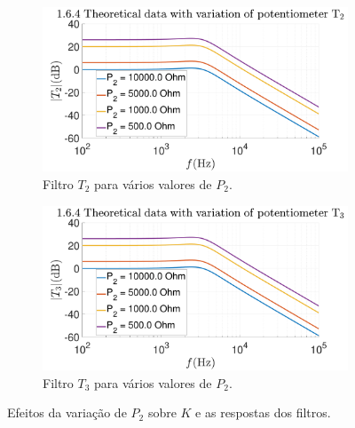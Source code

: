 \begin{figure}[ht]
     \begin{subfigure}[b]{0.45\textwidth}
         \centering
         \includegraphics[width=\textwidth]{Imagens/1_6_4_bodeTheoreticalPotentiometer2.pdf}
         \caption{Filtro $T_2$ para vários valores de $P_2$.}
         \label{fig:TT2_Bode_variacao_P2}
     \end{subfigure}
     \hfill
     \begin{subfigure}[b]{0.45\textwidth}
         \centering
         \includegraphics[width=\textwidth]{Imagens/1_6_4_bodeTheoreticalPotentiometer3.pdf}
         \caption{Filtro $T_3$ para vários valores de $P_2$.}
         \label{fig:TT3_Bode_variacao_P2}
     \end{subfigure}
    \caption{Efeitos da variação de $P_2$ sobre $K$ e as respostas dos filtros.}
\end{figure}

